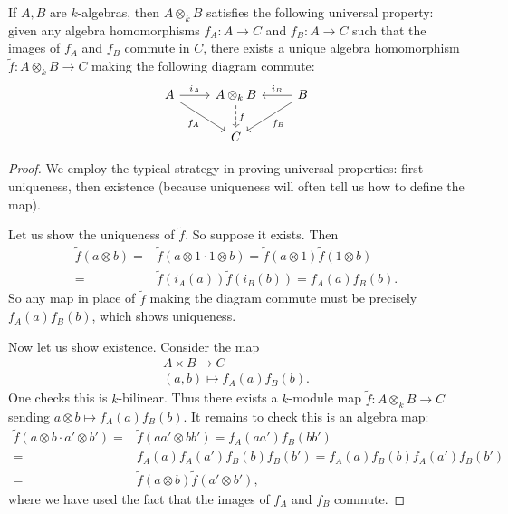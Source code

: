 \documentclass[12pt]{article}
\begin{document}
\begin{theorem}
	If $A,B$ are $k$-algebras, then $A\otimes_k B$ satisfies the following universal property: given any algebra homomorphisms $f_A:A\to C$ and $f_B:A\to C$ such that the images of $f_A$ and $f_B$ commute in $C$, there exists a unique algebra homomorphism $\tilde{f}:A\otimes_k B\to C$ making the following diagram commute:
	\begin{equation*}
\begin{tikzcd}
A \arrow[r, "i_A"] \arrow[rd, "f_A"'] & A\otimes_k B \arrow[d, "\tilde{f}", dashed] & B \arrow[l, "i_B"'] \arrow[ld, "f_B"] \\
                                      & C                                           &                                      
\end{tikzcd}
	\end{equation*}
\end{theorem}
\begin{proof}
	We employ the typical strategy in proving universal properties: first uniqueness, then existence (because uniqueness will often tell us how to define the map).

	Let us show the uniqueness of $\tilde{f}$. So suppose it exists. Then 
	\begin{align*}
		\tilde{f}(a\otimes b) 
		=& \tilde{f}(a\otimes 1 \cdot 1\otimes b) = \tilde{f}(a\otimes 1)\tilde{f}(1\otimes b) \\
		=& \tilde{f}(i_A(a))\tilde{f}(i_B(b)) = f_A(a)f_B(b).
	\end{align*}
	So any map in place of $\tilde{f}$ making the diagram commute must be precisely $f_A(a)f_B(b)$, which shows uniqueness. 

	Now let us show existence. Consider the map 
	\begin{gather*}
		A\times B \to C \\
		(a,b) \mapsto f_A(a)f_B(b).
	\end{gather*}
	One checks this is $k$-bilinear. Thus there exists a $k$-module map $\tilde{f}:A\otimes_k B\to C$ sending $a\otimes b\mapsto f_A(a)f_B(b)$. It remains to check this is an algebra map:
	\begin{align*}
		\tilde{f}(a\otimes b\cdot a'\otimes b') 
		=& \tilde{f}(aa'\otimes bb') = f_A(aa')f_B(bb') \\
		=& f_A(a)f_A(a')f_B(b)f_B(b') = f_A(a)f_B(b)f_A(a')f_B(b') \\
		=& \tilde{f}(a\otimes b)\tilde{f}(a'\otimes b'),
	\end{align*}
	where we have used the fact that the images of $f_A$ and $f_B$ commute.
\end{proof}
\end{document}
